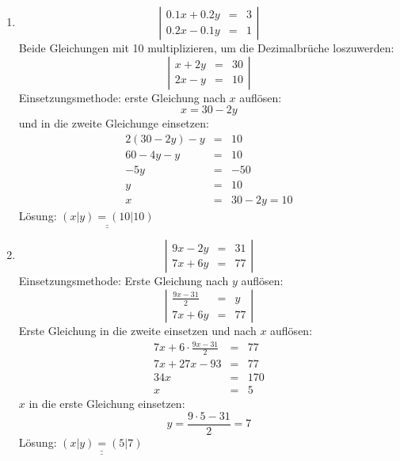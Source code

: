 \documentclass[%
11pt,%
twoside,%
titlepage,%
german,%
]{scrartcl}
\newcommand{\result}[1]{\underline{\underline{#1}}}
\begin{document}
\begin{enumerate}
\begin{enumerate}
  \item 
    \begin{displaymath}
      \left| 
        \begin{array}{rcl}
         0.1x + 0.2y & = & 3 \\
         0.2x - 0.1y & = & 1
        \end{array} \right|
    \end{displaymath}
Beide Gleichungen mit 10 multiplizieren, um die Dezimalbr\"uche loszuwerden:
    \begin{displaymath}
      \left| 
        \begin{array}{rcl}
         x + 2y & = & 30 \\
         2x - y & = & 10
        \end{array} \right|
    \end{displaymath}
Einsetzungsmethode: erste Gleichung nach $x$ aufl\"osen:
\begin{displaymath}
x= 30-2y
\end{displaymath}
und in die zweite Gleichunge einsetzen:
\begin{eqnarray*}
2(30-2y)-y & = & 10 \\
60-4y-y & = & 10 \\
-5y & = & -50 \\
y & = & 10 \\
x & = & 30-2y=10
\end{eqnarray*}
    L\"osung: $\result{(x|y)=(10|10)}$

  \item 
    \begin{displaymath}
      \left| 
        \begin{array}{rcl}
         9x-2y & = & 31 \\
         7x+6y & = & 77
        \end{array} \right|
    \end{displaymath}
    Einsetzungsmethode: Erste Gleichung nach $y$ aufl\"osen:
    \begin{displaymath}
      \left| 
        \begin{array}{rcl}
         \frac{9x-31}{2} & = & y \\
         7x+6y & = & 77
        \end{array} \right|
    \end{displaymath}
    Erste Gleichung in die zweite einsetzen und nach $x$ aufl\"osen:
    \begin{eqnarray*}
      7x + 6 \cdot \frac{9x-31}{2} & = & 77 \\
      7x + 27x-93 & = & 77 \\
      34x & = & 170 \\
      x & = & 5
    \end{eqnarray*}
    $x$ in die erste Gleichung einsetzen:
    \begin{displaymath}
      y = \frac{9\cdot 5 - 31}{2} = 7
    \end{displaymath}
    L\"osung: $\result{(x|y)=(5|7)}$


\end{enumerate}
\end{enumerate}
\end{document}
